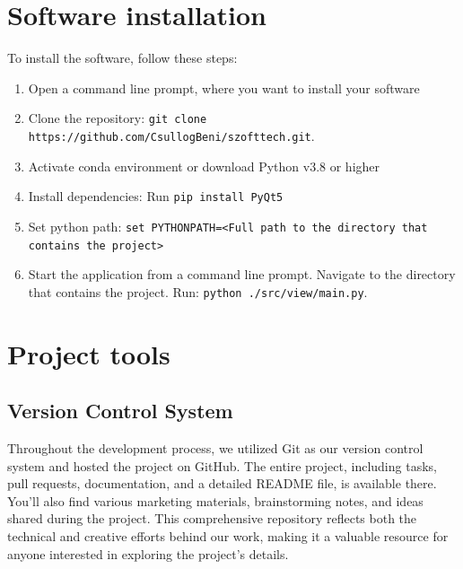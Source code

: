 \documentclass{article}
\begin{document}
\section{Software installation}

To install the software, follow these steps:

\begin{enumerate}
    \item Open a command line prompt, where you want to install your software
    \item Clone the repository\@: \texttt{git clone https://github.com/CsullogBeni/szofttech.git}.
    \item Activate conda environment or download Python v3.8 or higher
    \item Install dependencies\@: Run \texttt{pip install PyQt5}
    \item Set python path: \texttt{set PYTHONPATH=<Full path to the directory that contains the project>}
    \item Start the application from a command line prompt. Navigate to the directory that contains the project. Run: \@\texttt{python ./src/view/main.py}.
\end{enumerate}

\section{Project tools}

\subsection{Version Control System}

Throughout the development process, we utilized Git as our version control system and hosted the project on GitHub. The entire project, including tasks, pull requests, documentation, and a detailed README file, is available there. You'll also find various marketing materials, brainstorming notes, and ideas shared during the project. This comprehensive repository reflects both the technical and creative efforts behind our work, making it a valuable resource for anyone interested in exploring the project's details.
\end{document}
